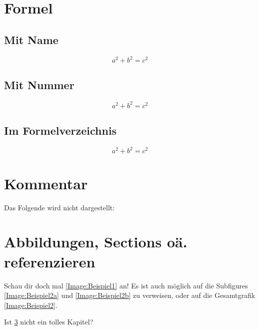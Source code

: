 \section{Formel}
\subsection{Mit Name}
\begin{equation}
	\tag{Satz des Pythagoras}
	a^2 + b^2 = c^2
	\label{equation:SatzDesPythagoras}
\end{equation}

\subsection{Mit Nummer}
\begin{equation}
	a^2 + b^2 = c^2
	\label{equation:SatzDesPythagoras}
\end{equation}

\subsection{Im Formelverzeichnis}
\begin{equation}
	a^2+b^2=c^2
\end{equation}

\section{Kommentar}
Das Folgende wird nicht dargestellt: 

\section{Abbildungen, Sections oä. referenzieren}
\label{Section:cref}

Schau dir doch mal \cref{Image:Beispiel1} an!
Es ist auch möglich auf die Subfigures \cref{Image:Beispiel2a} und \cref{Image:Beispiel2b} zu verweisen, oder auf die Gesamtgrafik \cref{Image:Beispiel2}.

Ist \cref{Section:cref} nicht ein tolles Kapitel?

